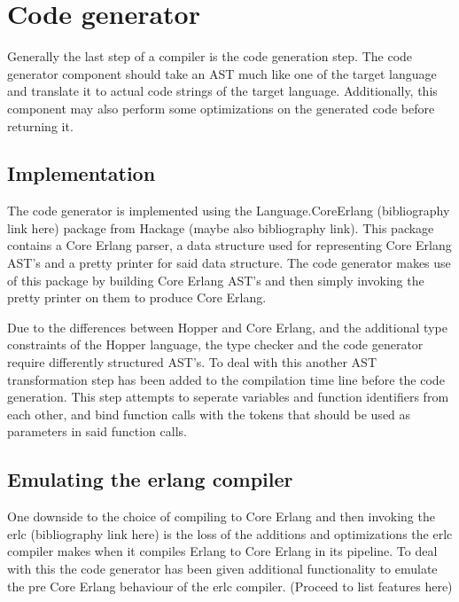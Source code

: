 \section{Code generator}

Generally the last step of a compiler is the code generation step. The code generator
component should take an AST much like one of the target language and translate it
to actual code strings of the target language. Additionally, this component may also
perform some optimizations on the generated code before returning it.

\subsection{Implementation}

The code generator is implemented using the Language.CoreErlang (bibliography link here)
package from Hackage (maybe also bibliography link). This package contains a Core Erlang
parser, a data structure used for representing Core Erlang AST's and a pretty printer for
said data structure. The code generator makes use of this package by building Core Erlang
AST's and then simply invoking the pretty printer on them to  produce Core Erlang.

Due to the differences between Hopper and Core Erlang, and the additional type constraints
of the Hopper language, the type checker and the code generator require differently
structured AST's. To deal with this another AST transformation step has been added to the
compilation time line before the code generation. This step attempts to seperate variables
and function identifiers from each other, and bind function calls with the tokens that
should be used as parameters in said function calls.

\subsection{Emulating the erlang compiler}

One downside to the choice of compiling to Core Erlang and then invoking the erlc
(bibliography link here) is the loss of the additions and optimizations the erlc
compiler makes when it compiles Erlang to Core Erlang in its pipeline. To deal with this
the code generator has been given additional functionality to emulate the pre Core Erlang
behaviour of the erlc compiler. (Proceed to list features here)

